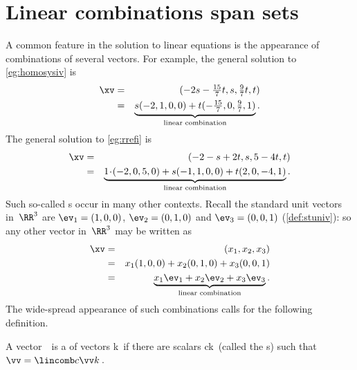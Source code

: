 
\section{Linear combinations span sets}
\label{sec:lcss}
\secttoc

\begin{comment}
\pooliv{\S2.3} \layiv{\S1.3} \holti{\S2.1--2} \nakos{\S2.3}
\end{comment}



A common feature in the solution to linear equations is the  appearance of combinations of several vectors.
For example, the general solution to \autoref{eg:homosysiv}  is 
\begin{eqnarray*}
\xv&=&(-2s-\tfrac{15}7t,s,\tfrac97t,t) 
\\&=&\underbrace{s(-2,1,0,0)+t(-\tfrac{15}7,0,\tfrac97,1)}_{\text{linear combination}}.
\end{eqnarray*}
The general solution to \autoref{eg:rrefi} is
\begin{eqnarray*}
\xv&=&(-2-s+2t,s,5-4t,t)
\\&=&\underbrace{1\cdot(-2,0,5,0)+s(-1,1,0,0)+t(2,0,-4,1)}_{\text{linear combination}}.
\end{eqnarray*}
Such so-called s occur in many other contexts.
Recall the standard unit vectors in~\(\RR^3\) are \(\ev_1=(1,0,0)\), \(\ev_2=(0,1,0)\) and \(\ev_3=(0,0,1)\) (\autoref{def:stuniv}): so any other vector in~\(\RR^3\) may be written as
\begin{eqnarray*}
\xv&=&(x_1,x_2,x_3)
\\&=&x_1(1,0,0)+x_2(0,1,0)+x_3(0,0,1)
\\&=&\underbrace{x_1\ev_1+x_2\ev_2+x_3\ev_3}_{\text{linear combination}}.
\end{eqnarray*}
The wide-spread appearance of such combinations calls for the following definition.

\begin{definition} \label{def:lincom}
A vector~\vv\ is a  of vectors \hlist\vv k\ if there are scalars \hlist ck\ (called the s) such that \(\vv=\lincomb c\vv k\)\,.
\end{definition}


